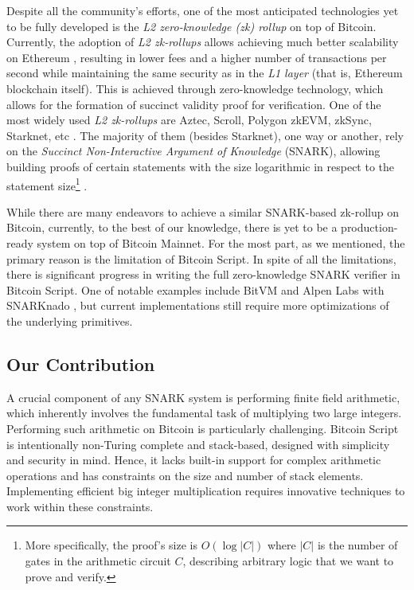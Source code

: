 \documentclass{iacrtrans}
\begin{document}
Despite all the community's efforts, one of the most anticipated technologies yet to be fully developed is the \textit{L2 zero-knowledge (zk) rollup} on top of Bitcoin. Currently, the adoption of \textit{L2 zk-rollups} allows achieving much better scalability on Ethereum \cite{ethereum}, resulting in lower fees and a higher number of transactions per second while maintaining the same security as in the \textit{L1 layer} (that is, Ethereum blockchain itself). This is achieved through zero-knowledge technology, which allows for the formation of succinct validity proof for verification. One of the most widely used \textit{L2 zk-rollups} are Aztec, Scroll, Polygon zkEVM, zkSync, Starknet, etc \cite{zk-rollups}. The majority of them (besides Starknet), one way or another, rely on the \textit{Succinct Non-Interactive Argument of Knowledge} (SNARK), allowing building proofs of certain statements with the size logarithmic in respect to the statement size\footnote{More specifically, the proof's size is $O(\log |C|)$ where $|C|$ is the number of gates in the arithmetic circuit $C$, describing arbitrary logic that we want to prove and verify.} \cite{zk-snark}. 

While there are many endeavors to achieve a similar SNARK-based zk-rollup on Bitcoin, currently, to the best of our knowledge, there is yet to be a production-ready system on top of Bitcoin Mainnet. For the most part, as we mentioned, the primary reason is the limitation of Bitcoin Script. In spite of all the limitations, there is significant progress in writing the full zero-knowledge SNARK verifier in Bitcoin Script. One of notable examples include BitVM \cite{bitvm} and Alpen Labs with SNARKnado \cite{alpen}, but current implementations still require more optimizations of the underlying primitives.

\subsection{Our Contribution}\label{section:our_contribution}

A crucial component of any SNARK system is performing finite field arithmetic, which inherently involves the fundamental task of multiplying two large integers. Performing such arithmetic on Bitcoin is particularly challenging. Bitcoin Script is intentionally non-Turing complete and stack-based, designed with simplicity and security in mind. Hence, it lacks built-in support for complex arithmetic operations and has constraints on the size and number of stack elements. Implementing efficient big integer multiplication requires innovative techniques to work within these constraints.
\end{document}
